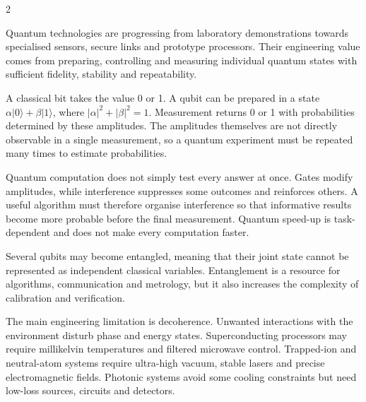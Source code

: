 

\begin{multicols}{2}
\begin{engineeringnews}
Quantum technologies are progressing from laboratory demonstrations towards specialised sensors, secure links
and prototype processors. Their engineering value comes from preparing, controlling and measuring individual
quantum states with sufficient fidelity, stability and repeatability.
\end{engineeringnews}

\begin{ecarticle}
A classical bit takes the value 0 or 1. A qubit can be prepared in a state
$\alpha\lvert0\rangle+\beta\lvert1\rangle$, where $|\alpha|^2+|\beta|^2=1$. Measurement returns 0 or 1 with
probabilities determined by these amplitudes. The amplitudes themselves are not directly observable in a single
measurement, so a quantum experiment must be repeated many times to estimate probabilities.

Quantum computation does not simply test every answer at once. Gates modify amplitudes, while interference
suppresses some outcomes and reinforces others. A useful algorithm must therefore organise interference so that
informative results become more probable before the final measurement. Quantum speed-up is task-dependent and
does not make every computation faster.

Several qubits may become entangled, meaning that their joint state cannot be represented as independent classical
variables. Entanglement is a resource for algorithms, communication and metrology, but it also increases the
complexity of calibration and verification.

The main engineering limitation is decoherence. Unwanted interactions with the environment disturb phase and
energy states. Superconducting processors may require millikelvin temperatures and filtered microwave control.
Trapped-ion and neutral-atom systems require ultra-high vacuum, stable lasers and precise electromagnetic fields.
Photonic systems avoid some cooling constraints but need low-loss sources, circuits and detectors.


\end{ecarticle}
\end{multicols}

